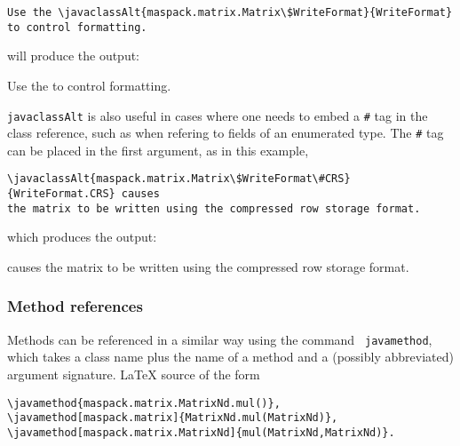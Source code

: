 \documentclass{article}
\begin{document}
\begin{lstlisting}[]
Use the \javaclassAlt{maspack.matrix.Matrix\$WriteFormat}{WriteFormat}
to control formatting.
\end{lstlisting}

will produce the output:

Use the 
to control formatting.

{\tt \BKS javaclassAlt} is also useful in cases where one needs to
embed a {\tt \#} tag in the class reference, such as when refering to
fields of an enumerated type. The {\tt \#} tag can be placed
in the first argument, as in this example,

\begin{lstlisting}[]
\javaclassAlt{maspack.matrix.Matrix\$WriteFormat\#CRS}{WriteFormat.CRS} causes
the matrix to be written using the compressed row storage format.
\end{lstlisting}

which produces the output:

 causes
the matrix to be written using the compressed row storage format.

%
%
%

\subsubsection{Method references}

Methods can be referenced in a similar way using the command {\tt
\BKS javamethod}, which takes a class name plus the name of a method and
a (possibly abbreviated) argument signature.
LaTeX source of the form

\begin{lstlisting}[]
\javamethod{maspack.matrix.MatrixNd.mul()}, 
\javamethod[maspack.matrix]{MatrixNd.mul(MatrixNd)},
\javamethod[maspack.matrix.MatrixNd]{mul(MatrixNd,MatrixNd)}.
\end{lstlisting}
\end{document}
